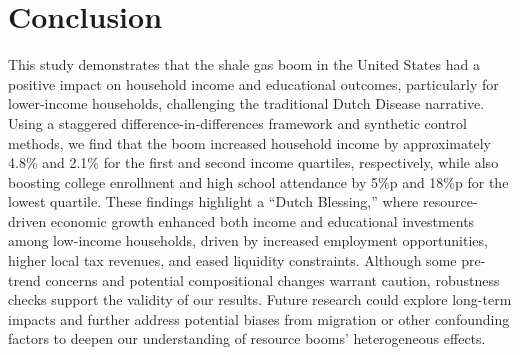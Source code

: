 \section{Conclusion}




This study demonstrates that the shale gas boom in the United States had a positive impact on household income and educational outcomes, particularly for lower-income households, challenging the traditional Dutch Disease narrative. Using a staggered difference-in-differences framework and synthetic control methods, we find that the boom increased household income by approximately 4.8\% and 2.1\% 
for the first and second income quartiles, respectively, while also boosting college enrollment and high school attendance by 5\%p and 18\%p for the lowest quartile. 
These findings highlight a “Dutch Blessing,” where resource-driven economic growth enhanced both income and educational investments among low-income households, driven by increased employment opportunities, higher local tax revenues, and eased liquidity constraints. 
Although some pre-trend concerns and potential compositional changes warrant caution, robustness checks support the validity of our results. 
Future research could explore long-term impacts and further address potential biases from migration or other confounding factors to deepen our understanding of resource booms' heterogeneous effects.